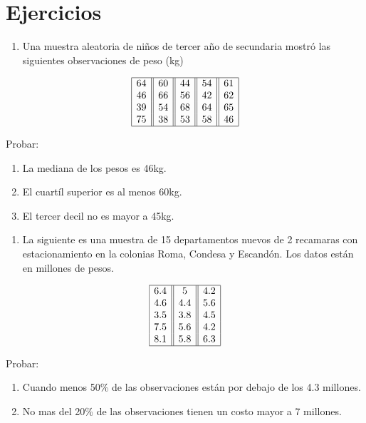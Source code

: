 \documentclass[
  a4paper,
  oneside,
  openany]{book}
\providecommand{\tightlist}{%
  \setlength{\itemsep}{0pt}\setlength{\parskip}{0pt}}
\begin{document}
\hypertarget{ejercicios-1}{%
\section{Ejercicios}\label{ejercicios-1}}

\begin{enumerate}
\def\labelenumi{\arabic{enumi}.}
\tightlist
\item
  Una muestra aleatoria de niños de tercer año de secundaria mostró las siguientes observaciones de peso (kg)
\end{enumerate}

\[
\begin{array}{|c| |c| |c| |c| |c|} 
\hline
64& 60& 44& 54& 61\\
46& 66& 56& 42& 62\\
39& 54& 68& 64& 65\\
75& 38& 53& 58&46\\
\hline
\end{array}
\]

Probar:

\begin{enumerate}
\def\labelenumi{\alph{enumi})}
\item
  La mediana de los pesos es 46kg.
\item
  El cuartíl superior es al menos 60kg.
\item
  El tercer decil no es mayor a 45kg.
\end{enumerate}

\begin{enumerate}
\def\labelenumi{\arabic{enumi}.}
\setcounter{enumi}{1}
\tightlist
\item
  La siguiente es una muestra de 15 departamentos nuevos de 2 recamaras con estacionamiento en la colonias Roma, Condesa y Escandón. Los datos están en millones de pesos.
\end{enumerate}

\[
\begin{array}{|c| |c| |c|} 
\hline
6.4&    5&  4.2\\
4.6&    4.4&    5.6\\
3.5&    3.8&    4.5\\
7.5&    5.6&    4.2\\
8.1&    5.8&    6.3\\
\hline
\end{array}
\]

Probar:

\begin{enumerate}
\def\labelenumi{\alph{enumi})}
\item
  Cuando menos 50\% de las observaciones están por debajo de los 4.3 millones.
\item
  No mas del 20\% de las observaciones tienen un costo mayor a 7 millones.
\end{enumerate}
\end{document}
